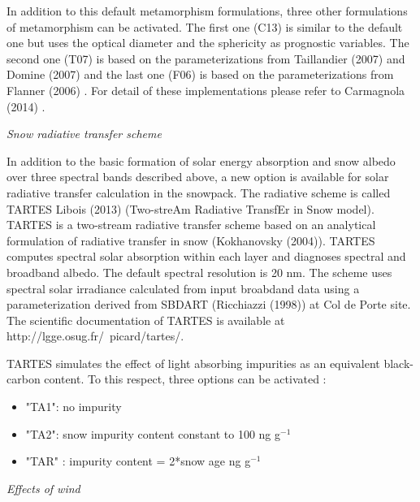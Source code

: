 In addition to this default metamorphism formulations, three other formulations 
of metamorphism can be activated. The first one (C13) is similar to the default 
one but uses the optical diameter and the sphericity as prognostic variables. 
The second one (T07) is based on the parameterizations from Taillandier \etal (2007)
\nocite{taillandier2007}%
and Domine \etal (2007) \nocite{domine2007}%
and the last one (F06) is based on the parameterizations 
from Flanner \etal (2006) \nocite{flanner2006}.%
For detail of these implementations please refer to Carmagnola \etal (2014) 
\nocite{Carmagnola2014}.%

{\it Snow radiative transfer scheme}

In addition to the basic formation of solar energy absorption and snow albedo 
over three spectral bands described above, a new option is available for solar 
radiative transfer calculation in the snowpack. The radiative scheme is called 
TARTES Libois \etal (2013) \nocite{libois2013}%
(Two-streAm Radiative TransfEr in Snow model). TARTES 
is a two-stream radiative transfer scheme based on an analytical formulation of 
radiative transfer in snow (Kokhanovsky \etal (2004))\nocite{kokhanovsky2004}.
TARTES computes spectral  solar absorption within each layer and diagnoses spectral 
and broadband albedo. The default spectral resolution is 20 nm. The scheme uses 
spectral solar irradiance calculated from input broabdand data using a parameterization 
derived from SBDART (Ricchiazzi \etal (1998))\nocite{ricchiazzi1998} %
at Col de Porte site. The scientific documentation of TARTES is available at 
http://lgge.osug.fr/~picard/tartes/. 

TARTES simulates the effect of light absorbing impurities as an equivalent 
black-carbon content. To this respect, three options can be activated :

\begin{itemize}
\item "TA1": no impurity
\item "TA2":  snow impurity content constant to 100 ng g$^{-1}$
\item "TAR" : impurity content = 2*snow age ng g$^{-1}$
\end{itemize} 

{\it Effects of wind}

